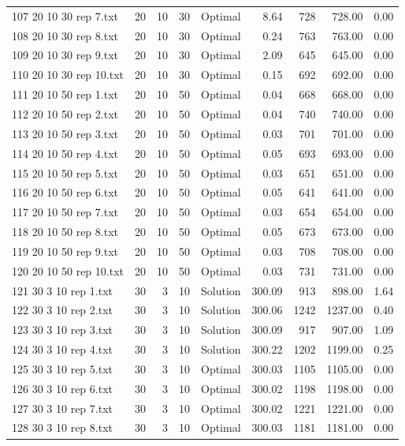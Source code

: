 \begin{longtable}{lrrllrrrr}
107 20 10 30 rep 7.txt & 20 & 10 & 30 & Optimal &  8.64 & 728 & 728.00 &  0.00\\
108 20 10 30 rep 8.txt & 20 & 10 & 30 & Optimal &  0.24 & 763 & 763.00 &  0.00\\
109 20 10 30 rep 9.txt & 20 & 10 & 30 & Optimal &  2.09 & 645 & 645.00 &  0.00\\
110 20 10 30 rep 10.txt & 20 & 10 & 30 & Optimal &  0.15 & 692 & 692.00 &  0.00\\
111 20 10 50 rep 1.txt & 20 & 10 & 50 & Optimal &  0.04 & 668 & 668.00 &  0.00\\
112 20 10 50 rep 2.txt & 20 & 10 & 50 & Optimal &  0.04 & 740 & 740.00 &  0.00\\
113 20 10 50 rep 3.txt & 20 & 10 & 50 & Optimal &  0.03 & 701 & 701.00 &  0.00\\
114 20 10 50 rep 4.txt & 20 & 10 & 50 & Optimal &  0.05 & 693 & 693.00 &  0.00\\
115 20 10 50 rep 5.txt & 20 & 10 & 50 & Optimal &  0.03 & 651 & 651.00 &  0.00\\
116 20 10 50 rep 6.txt & 20 & 10 & 50 & Optimal &  0.05 & 641 & 641.00 &  0.00\\
117 20 10 50 rep 7.txt & 20 & 10 & 50 & Optimal &  0.03 & 654 & 654.00 &  0.00\\
118 20 10 50 rep 8.txt & 20 & 10 & 50 & Optimal &  0.05 & 673 & 673.00 &  0.00\\
119 20 10 50 rep 9.txt & 20 & 10 & 50 & Optimal &  0.03 & 708 & 708.00 &  0.00\\
120 20 10 50 rep 10.txt & 20 & 10 & 50 & Optimal &  0.03 & 731 & 731.00 &  0.00\\
121 30 3 10 rep 1.txt & 30 & 3 & 10 & Solution & 300.09 & 913 & 898.00 &  1.64\\
122 30 3 10 rep 2.txt & 30 & 3 & 10 & Solution & 300.06 & 1242 & 1237.00 &  0.40\\
123 30 3 10 rep 3.txt & 30 & 3 & 10 & Solution & 300.09 & 917 & 907.00 &  1.09\\
124 30 3 10 rep 4.txt & 30 & 3 & 10 & Solution & 300.22 & 1202 & 1199.00 &  0.25\\
125 30 3 10 rep 5.txt & 30 & 3 & 10 & Optimal & 300.03 & 1105 & 1105.00 &  0.00\\
126 30 3 10 rep 6.txt & 30 & 3 & 10 & Optimal & 300.02 & 1198 & 1198.00 &  0.00\\
127 30 3 10 rep 7.txt & 30 & 3 & 10 & Optimal & 300.02 & 1221 & 1221.00 &  0.00\\
128 30 3 10 rep 8.txt & 30 & 3 & 10 & Optimal & 300.03 & 1181 & 1181.00 &  0.00\\

\end{longtable}
